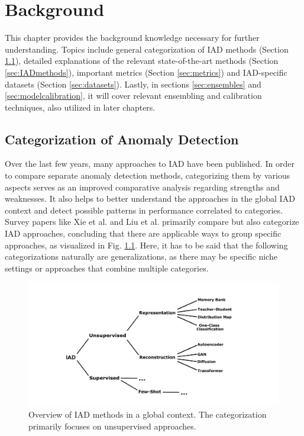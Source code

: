 \chapter{Background}
\label{chap:background}

This chapter provides the background knowledge necessary for further understanding. Topics include general categorization of IAD methods (Section \ref{sec:IADcategs}), detailed explanations of the relevant 
state-of-the-art methods (Section \ref{sec:IADmethods}), important metrics (Section \ref{sec:metrics}) and IAD-specific datasets (Section \ref{sec:datasets}). Lastly, in 
sections \ref{sec:ensembles} and \ref{sec:modelcalibration}, 
it will cover relevant ensembling and calibration techniques, also utilized in later chapters.



\section{Categorization of Anomaly Detection}
\label{sec:IADcategs}
Over the last few years, many approaches to IAD have been published. In order to compare separate anomaly detection methods, categorizing them by various 
aspects serves as an improved comparative analysis regarding strengths and weaknesses. It also helps to better understand the approaches in the global IAD context and
detect possible patterns in performance correlated to categories. Survey papers like Xie et al. \cite{Xie_2024benchmarking} and 
Liu et al.
\cite{liu2024deep} primarily compare but also categorize IAD approaches, concluding that there are applicable ways to group specific approaches, as 
visualized in Fig. \ref{fig:IADcategstree}. Here, it has to be said that the following categorizations naturally are generalizations, as there may be specific niche settings or approaches that combine multiple categories.


\begin{figure}[H]
\centering
\includegraphics[width=\textwidth]{figures/Wald.pdf}
\caption{Overview of IAD methods in a global context. The categorization primarily focuses on unsupervised approaches.}
\label{fig:IADcategstree}
\end{figure}

